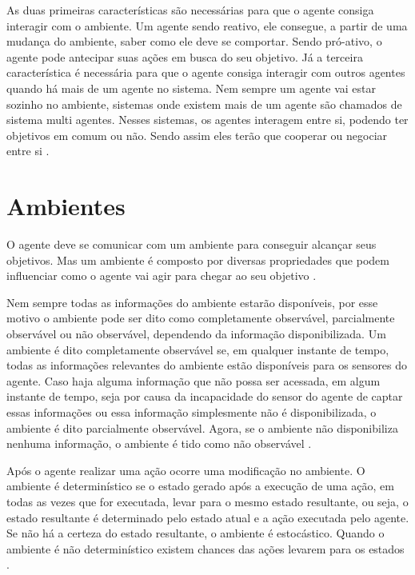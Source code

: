 As duas primeiras características são necessárias para que o agente consiga interagir com o ambiente. Um agente sendo reativo, ele consegue, a partir de uma mudança do ambiente, saber como ele deve se comportar. Sendo pró-ativo, o agente pode antecipar suas ações em busca do seu objetivo.
Já a terceira característica é necessária para que o agente consiga interagir com outros agentes quando há mais de um agente no sistema. Nem sempre um agente vai estar sozinho no ambiente, sistemas onde existem mais de um agente são chamados de sistema multi agentes. Nesses sistemas, os agentes interagem entre si, podendo ter objetivos em comum ou não. Sendo assim eles terão que cooperar ou negociar entre si \cite{intelligence2003modern}.

\section{Ambientes}

O agente deve se comunicar com um ambiente para conseguir alcançar seus objetivos. Mas um ambiente é composto por diversas propriedades que podem influenciar como o agente vai agir para chegar ao seu objetivo \cite{intelligence2003modern}. 

Nem sempre todas as informações do ambiente estarão disponíveis, por esse motivo o ambiente pode ser dito como completamente observável, parcialmente observável ou não observável, dependendo da informação disponibilizada. Um ambiente é dito completamente observável se, em qualquer instante de tempo, todas as informações relevantes do ambiente estão disponíveis para os sensores do agente. Caso haja alguma informação que não possa ser acessada, em algum instante de tempo, seja por causa da incapacidade do sensor do agente de captar essas informações ou essa informação simplesmente não é disponibilizada, o ambiente é dito parcialmente observável. Agora, se o ambiente não disponibiliza nenhuma informação, o ambiente é tido como não observável \cite{ intelligence2003modern, agent1999}.   

Após o agente realizar uma ação ocorre uma modificação no ambiente. O ambiente é determinístico se o estado gerado após a execução de uma ação, em todas as vezes que for executada, levar para o mesmo estado resultante, ou seja, o estado resultante é determinado pelo estado atual e a ação executada pelo agente. Se não há a certeza do estado resultante, o ambiente é estocástico. Quando o ambiente  é não determinístico existem chances das ações levarem para os estados \cite{intelligence2003modern}. 

